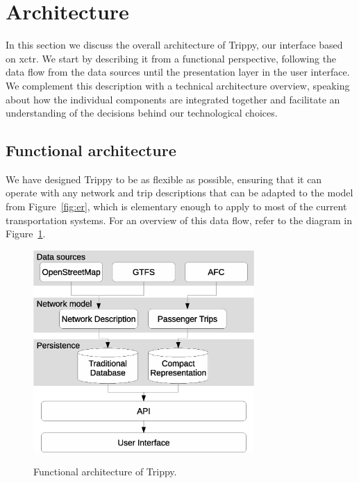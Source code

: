 	\section{Architecture}
	In this section we discuss the overall architecture of Trippy, our interface based on \gls{xctr}. We start by describing it from a functional perspective, following the data flow from the data sources until the presentation layer in the user interface. We complement this description with a technical architecture overview, speaking about how the individual components are integrated together and facilitate an understanding of the decisions behind our technological choices.
	
	\subsection{Functional architecture}
	We have designed Trippy to be as flexible as possible, ensuring that it can operate with any network and trip descriptions that can be adapted to the model from Figure~\ref{fig:er}, which is elementary enough to apply to most of the current transportation systems. For an overview of this data flow, refer to the diagram in Figure~\ref{fig:arch:functional}.
	
	\begin{figure}[ht]
		\begin{center}
			{\includegraphics[width=0.75\textwidth]{figures/funcional_trippy.eps}}
		\end{center}
		\caption{Functional architecture of Trippy.}
		\label{fig:arch:functional}
	\end{figure}
	
